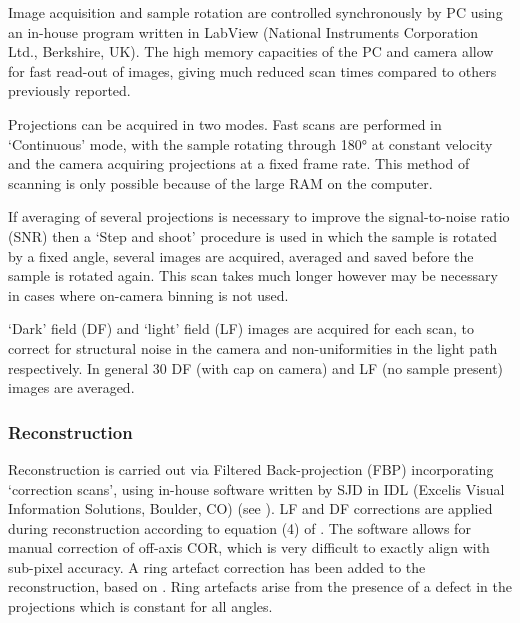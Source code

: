 Image acquisition and sample rotation are controlled synchronously  by PC using an in-house program written in LabView (National Instruments Corporation Ltd., Berkshire, UK). The high memory capacities of the PC and camera allow for fast read-out of images, giving much reduced scan times compared to others previously reported. 

Projections can be acquired in two modes. Fast scans are performed in `Continuous' mode, with the sample rotating through \ang{180} at constant velocity and the camera acquiring projections at a fixed frame rate. This method of scanning is only possible because of the large RAM on the computer. 

If averaging of several projections is necessary to improve the signal-to-noise ratio (SNR) then a `Step and shoot' procedure is used in which the sample is rotated by a fixed angle, several images are acquired, averaged and saved before the sample is rotated again. This scan takes much longer however may be necessary in cases where on-camera binning is not used. 


`Dark' field (DF) and `light' field (LF) images are acquired for each scan, to correct for structural noise in the camera and non-uniformities in the light path respectively. In general 30 DF (with cap on camera) and LF (no sample present) images are averaged. 



\subsubsection{Reconstruction}
Reconstruction is carried out via Filtered Back-projection (FBP) incorporating  `correction scans', using in-house software  written by  SJD in IDL (Excelis Visual Information Solutions, Boulder, CO) (see \cite{doranestablishing2013}). LF and DF corrections are applied during reconstruction according to  equation (4) of %
\cite{Krstajic:2007ec}.  
The software  allows for manual correction of off-axis COR, which is very difficult to exactly align  with sub-pixel accuracy. %
A ring artefact correction has been added to the reconstruction, based on \cite{rivers2009ring}. %
Ring artefacts arise from the presence of a defect in the projections which is constant for all angles. %



